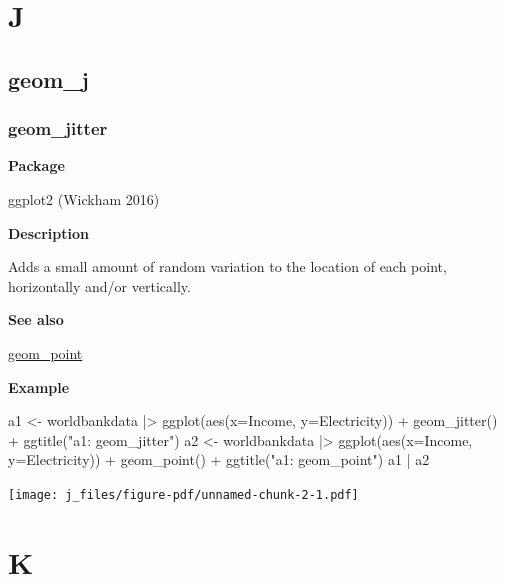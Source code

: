 \documentclass[
  letterpaper,
  DIV=11,
  numbers=noendperiod]{scrreprt}
\newenvironment{Shaded}{\begin{snugshade}}{\end{snugshade}}
\newcommand{\AttributeTok}[1]{\textcolor[rgb]{0.40,0.45,0.13}{#1}}
\newcommand{\FunctionTok}[1]{\textcolor[rgb]{0.28,0.35,0.67}{#1}}
\newcommand{\NormalTok}[1]{\textcolor[rgb]{0.00,0.23,0.31}{#1}}
\newcommand{\OtherTok}[1]{\textcolor[rgb]{0.00,0.23,0.31}{#1}}
\newcommand{\SpecialCharTok}[1]{\textcolor[rgb]{0.37,0.37,0.37}{#1}}
\newcommand{\StringTok}[1]{\textcolor[rgb]{0.13,0.47,0.30}{#1}}
\begin{document}
\part{J}

\chapter{geom\_j}\label{sec-j}

\section{geom\_jitter}\label{jitter}

\textbf{Package}

ggplot2 (Wickham 2016)

\textbf{Description}

Adds a small amount of random variation to the location of each point,
horizontally and/or vertically.

\textbf{See also}

\hyperref[point]{geom\_point}

\textbf{Example}

\begin{Shaded}
\begin{Highlighting}[]
\NormalTok{a1 }\OtherTok{\textless{}{-}}\NormalTok{ worldbankdata }\SpecialCharTok{|\textgreater{}}
  \FunctionTok{ggplot}\NormalTok{(}\FunctionTok{aes}\NormalTok{(}\AttributeTok{x=}\NormalTok{Income, }\AttributeTok{y=}\NormalTok{Electricity)) }\SpecialCharTok{+} 
  \FunctionTok{geom\_jitter}\NormalTok{() }\SpecialCharTok{+} \FunctionTok{ggtitle}\NormalTok{(}\StringTok{"a1: geom\_jitter"}\NormalTok{)}
\NormalTok{a2 }\OtherTok{\textless{}{-}}\NormalTok{ worldbankdata }\SpecialCharTok{|\textgreater{}}
  \FunctionTok{ggplot}\NormalTok{(}\FunctionTok{aes}\NormalTok{(}\AttributeTok{x=}\NormalTok{Income, }\AttributeTok{y=}\NormalTok{Electricity)) }\SpecialCharTok{+} 
  \FunctionTok{geom\_point}\NormalTok{() }\SpecialCharTok{+} \FunctionTok{ggtitle}\NormalTok{(}\StringTok{"a1: geom\_point"}\NormalTok{)}
\NormalTok{a1 }\SpecialCharTok{|}\NormalTok{ a2}
\end{Highlighting}
\end{Shaded}

\texttt{[image: j\_files/figure-pdf/unnamed-chunk-2-1.pdf]}

\part{K}
\end{document}
